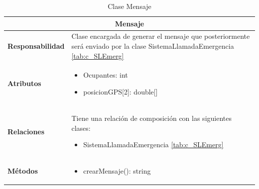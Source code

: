 \begin{table}[H]
\begin{center}
\begin{tabular}{p{} p{11cm}}
\multicolumn{2}{c}{\textbf{Mensaje} } \\ \hline \hline
\textbf{Responsabilidad} &   Clase encargada de generar el mensaje que posteriormente será enviado por la clase SistemaLlamadaEmergencia \ref{tab:c_SLEmerg}  \\ \hline
\textbf{Atributos} & \begin{itemize}
                      \item Ocupantes: int
                      \item posicionGPS[2]: double[]
                    \end{itemize}\\ \hline
\textbf{Relaciones} & \par Tiene una relación de composición con las siguientes clases:
                      \begin{itemize}
                        \item SistemaLlamadaEmergencia \ref{tab:c_SLEmerg}
                      \end{itemize}

                      \\ \hline

\textbf{Métodos} &  \begin{itemize}
                      \item crearMensaje(): string
                    \end{itemize}\\ \hline
\end{tabular}
\caption{Clase Mensaje}
\label{tab:c_mensaje}
\end{center}
\end{table}




